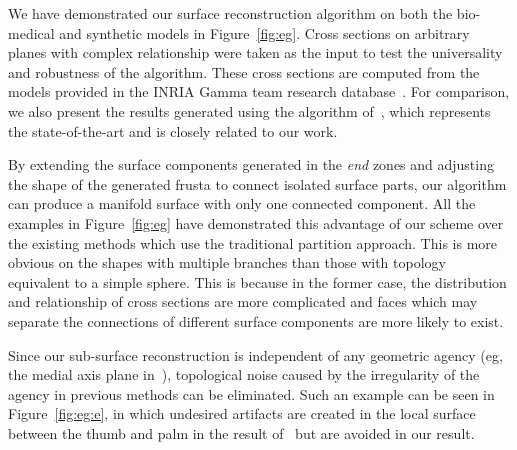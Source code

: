 We have demonstrated our surface reconstruction algorithm on both
the bio-medical and synthetic models in Figure~\ref{fig:eg}. Cross
sections on arbitrary planes with complex relationship were taken as
the input to test the universality and robustness of the algorithm.
These cross sections are computed from the models provided in the
INRIA Gamma team research database~\cite{INRIA}. For comparison, we also present
the results generated using the algorithm of~\cite{LBDLJ08}, which
represents the state-of-the-art and is closely related to our work.

By extending the surface  components generated in the \textit{end}
zones and adjusting the shape of the generated frusta to connect
isolated surface parts, our algorithm can produce a manifold surface
with only one connected component. All the examples in
Figure~\ref{fig:eg} have demonstrated this advantage of our scheme
over the existing methods which use the traditional partition
approach. This is more obvious on the shapes with multiple branches
than those with topology equivalent to a simple sphere. This is
because in the former case, the distribution and relationship of
cross sections are more complicated and faces which may separate the
connections of different surface components are more likely to
exist.

Since our sub-surface reconstruction  is independent of any
geometric agency (eg, the medial axis plane in~\cite{LBDLJ08}),
topological noise caused by the irregularity of the agency in
previous methods can be eliminated. Such an example can be seen in
Figure~\ref{fig:eg:e}, in which undesired artifacts are created in
the local surface between the thumb and palm in the result
of~\cite{LBDLJ08} but are avoided in our result.

